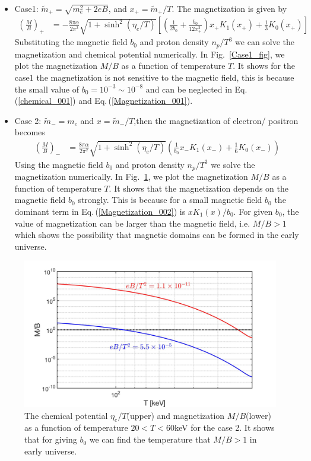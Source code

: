 \documentclass[Universe,article,submit,moreauthors,pdftex]{Definitions/mdpi}
\newcommand{\req}[1]{Eq.\,(\ref{#1})}
\newcommand*{\rf}[1]{Fig.~{\ref{#1}}}
\begin{document}
\begin{itemize}
  \item Case1: $\tilde m_+=\sqrt{m^2_e+2eB}$, and $x_+=\tilde m_+/T$. The magnetization is given by
  \begin{align}\label{Magnetization_001}
 \left(\frac{M}{B}\right)_+&=-\frac{8\pi\alpha}{2\pi^2}\sqrt{1+\sinh^2(\eta_e/T)}\left[\left(\frac{1}{2b_0}+\frac{b_0}{12x_+^2}\right)x_+K_1(x_+)+\frac{1}{3}K_0(x_+)\right]
   \end{align}
Substituting the magnetic field $b_0$ and proton density $n_p/T^3$  we can solve the magnetization and chemical potential numerically. In \rf{Case1_fig}, we plot the  magnetization $M/B$ as a function of temperature $T$. It shows for the case1 the magnetization is not sensitive to the magnetic field, this is because the small value of $b_0=10^{-3}\sim10^{-8}$ and can be neglected in \req{chemical_001} and \req{Magnetization_001}.
\\
  \item Case 2: $\tilde m_-=m_e$ and $x=\tilde m_-/T$,then the magnetization of electron/ positron becomes
\begin{align}\label{Magnetization_002}
\left(\frac{M}{B}\right)_-&=\frac{8\pi\alpha}{2\pi^2}\sqrt{1+\sinh^2(\eta_e/T)}\left(\frac{1}{b_0}x_-K_1(x_-)+\frac{1}{6}K_0(x_-)\right)
\end{align}
Using the magnetic field $b_0$ and proton density $n_p/T^3$ we solve the magnetization  numerically. In \rf{Case2_fig}, we plot the  magnetization $M/B$ as a function of temperature $T$. It shows that the magnetization depends on the magnetic field $b_0$ strongly. This is because for a small magnetic field $b_0$ the dominant term in \req{Magnetization_002} is $xK_1(x)/b_0$. For given $b_0$, the value of magnetization can be larger than the magnetic field, i.e. $M/B>1$  which shows the possibility that magnetic domains can be formed in the early universe.
\end{itemize}
\begin{figure}[h]
\centering
\includegraphics[width=\textwidth]{MagnetizationFinal_200keV.jpg}
\caption{The chemical potential $\eta_{e}/T$(upper) and magnetization $M/B$(lower) as a function of temperature $20<T<60$keV  for the case 2.  It shows that for giving $b_0$ we can find the temperature that $M/B>1$ in early universe.}
\label{Case2_fig} 
\end{figure}
\end{document}
